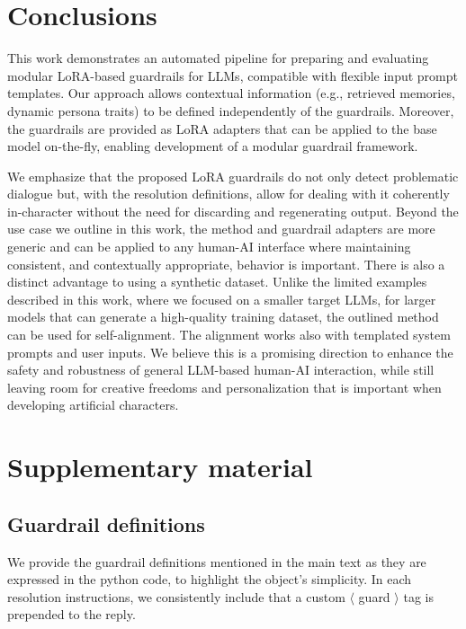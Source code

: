 \documentclass[letterpaper]{article}
\begin{document}
\section{Conclusions}
This work demonstrates an automated pipeline for preparing and evaluating modular LoRA-based guardrails for LLMs, compatible with flexible input prompt templates. Our approach allows contextual information (e.g., retrieved memories, dynamic persona traits) to be defined independently of the guardrails.
Moreover, the guardrails are provided as LoRA adapters that can be applied to the base model on-the-fly, enabling development of a modular guardrail framework.

We emphasize that the proposed LoRA guardrails do not only detect problematic dialogue but, with the resolution definitions, allow for dealing with it coherently in-character without the need for discarding and regenerating output.
Beyond the use case we outline in this work, the method and guardrail adapters are more generic and can be applied to any human-AI interface where maintaining consistent, and contextually appropriate, behavior is important.  
There is also a distinct advantage to using a synthetic dataset. Unlike the limited examples described in this work, where we focused on a smaller target LLMs, for larger models that can generate a high-quality training dataset, the outlined method can be used for self-alignment. 
The alignment works also with templated system prompts and user inputs. We believe this is a promising direction to enhance the safety and robustness of general LLM-based human-AI interaction, while still leaving room for creative freedoms and personalization that is important when developing artificial characters. 
\footnotesize


    
\onecolumn
\appendix 
\section{Supplementary material}\label{app:appendix}
\subsection{Guardrail definitions}\label{app:guardrail-definitions}
We provide the guardrail definitions mentioned in the main text as they are expressed in the python code, to highlight the object's simplicity. In each resolution instructions, we consistently include that a custom $\langle$ guard $\rangle$ tag is prepended to the reply. 
\end{document}

